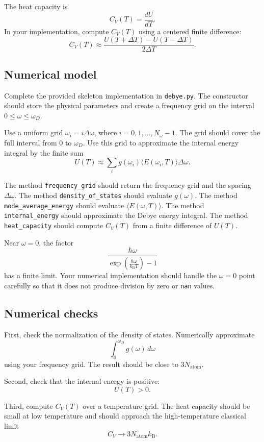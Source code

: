 The heat capacity is
\[
C_V(T)=\frac{dU}{dT}.
\]
In your implementation, compute \(C_V(T)\) using a centered finite difference:
\[
C_V(T)\approx
\frac{U(T+\Delta T)-U(T-\Delta T)}{2\Delta T}.
\]

\subsection{Numerical model}

Complete the provided skeleton implementation in \texttt{debye.py}. The constructor should store the physical parameters and create a frequency grid on the interval \(0\le\omega\le\omega_D\).

Use a uniform grid \(\omega_i=i\Delta\omega\), where \(i=0,1,\ldots,N_\omega-1\). The grid should cover the full interval from \(0\) to \(\omega_D\). Use this grid to approximate the internal energy integral by the finite sum
\[
U(T)\approx
\sum_i
g(\omega_i)
\langle E(\omega_i,T)\rangle
\Delta\omega.
\]

The method \texttt{frequency\_grid} should return the frequency grid and the spacing \(\Delta\omega\). The method \texttt{density\_of\_states} should evaluate \(g(\omega)\). The method \texttt{mode\_average\_energy} should evaluate \(\langle E(\omega,T)\rangle\). The method \texttt{internal\_energy} should approximate the Debye energy integral. The method \texttt{heat\_capacity} should compute \(C_V(T)\) from a finite difference of \(U(T)\).

Near \(\omega=0\), the factor
\[
\frac{\hbar\omega}{
\exp\left(\frac{\hbar\omega}{k_{\mathrm B}T}\right)-1
}
\]
has a finite limit. Your numerical implementation should handle the \(\omega=0\) point carefully so that it does not produce division by zero or \texttt{nan} values.

\subsection{Numerical checks}

First, check the normalization of the density of states. Numerically approximate
\[
\int_0^{\omega_D}g(\omega)\,d\omega
\]
using your frequency grid. The result should be close to \(3N_{\mathrm{atom}}\).

Second, check that the internal energy is positive:
\[
U(T)>0.
\]

Third, compute \(C_V(T)\) over a temperature grid. The heat capacity should be small at low temperature and should approach the high-temperature classical limit
\[
C_V\rightarrow3N_{\mathrm{atom}}k_{\mathrm B}.
\]

